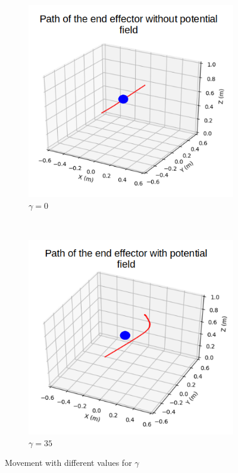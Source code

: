 \documentclass[a4paper, 10pt, conference]{ieeeconf}      %
\begin{document}
\begin{figure}[H]
	\centering
	\label{potential}
	\begin{subfigure}[t]{0.20\textwidth}
		\centering
		\includegraphics[scale=0.35]{images/no_potential.png}
		\caption{$\gamma = 0$}
	\end{subfigure}%
	~ 
	\begin{subfigure}[t]{0.20\textwidth}
		\centering
		\includegraphics[scale=0.35]{images/yes_potential.png}
		\caption{$\gamma = 35$}
	\end{subfigure}
	\caption{Movement with different values for $\gamma$}
\end{figure}
\end{document}
